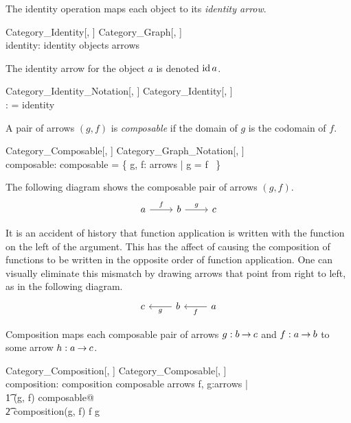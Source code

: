 \documentclass{amsart}
\begin{document}
The identity operation maps each object to its \textit{identity arrow}.
\begin{schema}{Category\_Identity}[\genO, \genA]
	Category\_Graph[\genO, \genA] \\
	identity: \genO \pfun \genA
\where
	identity \in objects \fun arrows
\end{schema}

The identity arrow for the object $a$ is denoted $\operatorname{id} a$.
\begin{schema}{Category\_Identity\_Notation}[\genO, \genA]
	Category\_Identity[\genO, \genA] \\
	\idCat: \genO \pfun \genA
\where
	\idCat = identity
\end{schema}

A pair of arrows $(g, f)$ is \textit{composable} if the domain of $g$ is the codomain of $f$.
\begin{schema}{Category\_Composable}[\genO, \genA]
	Category\_Graph\_Notation[\genO, \genA] \\
	composable: \genA \rel \genA
\where
	composable = \{ g, f: arrows | \domCat g = \codCat f ~\}
\end{schema}

The following diagram shows the composable pair of arrows $(g, f)$.
$$
  \begin{tikzcd}
    a \arrow{r}{f} & b \arrow{r}{g} & c
  \end{tikzcd}
$$

It is an accident of history that function application is written with the function on the left of the argument.
This has the affect of causing the composition of functions to be written in the opposite order of function application.
One can visually eliminate this mismatch by drawing arrows that point from right to left, as in the following diagram.
$$
  \begin{tikzcd}
    c & b \arrow{l}{g} & a \arrow{l}{f}
  \end{tikzcd}
$$

Composition maps each composable pair of arrows $g: b \mathbin{\rightarrow} c$ and $f: a \mathbin{\rightarrow} b$ to some arrow $h: a \mathbin{\rightarrow} c$.
\begin{schema}{Category\_Composition}[\genO, \genA]
	Category\_Composable[\genO, \genA] \\
	composition: \genA \cross \genA \pfun \genA
\where
	composition \in composable \fun arrows
\also
	\forall f, g:arrows | \\
	\t1	(g, f) \in composable@ \\
	\t2		composition(g, f) \in \domCat f \arrCat \codCat g
\end{schema}
\end{document}
